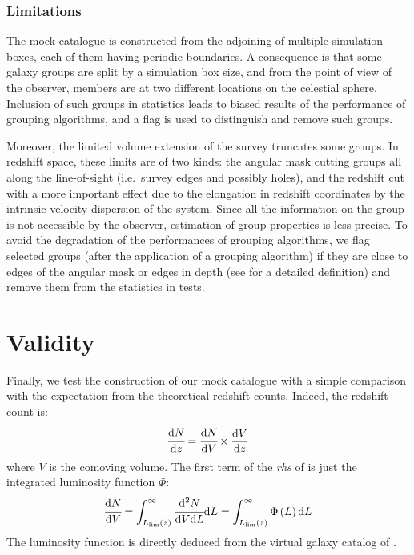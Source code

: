 \subsubsection{Limitations}
\label{ssub:galaxy_samples_limitations}

The mock catalogue is constructed from the adjoining of multiple simulation
boxes, each of them having periodic boundaries. A consequence is that some
galaxy groups are split by a simulation box size, and from the point of view of
the observer, members are at two different locations on the celestial sphere.
Inclusion of such groups in statistics leads to biased results of the
performance of grouping algorithms, and a flag is used to distinguish and
remove such groups.

Moreover, the limited volume extension of the survey truncates some groups. In
redshift space, these limits are of two kinds: the angular mask cutting groups
all along the line-of-sight (i.e.\ survey edges and possibly holes), and the
redshift cut with a more important effect due to the elongation in redshift
coordinates by the intrinsic velocity dispersion of the system. Since all the
information on the group is not accessible by the observer, estimation of group
properties is less precise. To avoid the degradation of the performances of
grouping algorithms, we flag selected groups (after the application of a
grouping algorithm) if they are close to edges of the angular mask or edges in
depth (see  for a detailed
definition) and remove them from the statistics in tests.

\section{Validity}
\label{sec:validity}

Finally, we test the construction of our mock catalogue with a simple
comparison with the expectation from the theoretical redshift counts. Indeed,
the redshift count is:
%
\begin{equation}
    \label{eq:counts}
    \cfrac{{\rm{d}} N}{{\rm{d}} z} = \cfrac{{\rm{d}} N}{{\rm{d}} V}\times\frac{{\rm{d}} V}{{\rm{d}} z}
\end{equation}
%
where $V$ is the comoving volume.
The first term of the \emph{rhs} of  is just the integrated luminosity function
$\Phi$:
%
\begin{equation}
    \cfrac{{\rm{d}} N}{{\rm{d}} V} = \int_{L_{\lim} \left(z\right)}^\infty
    \cfrac{{\rm{d}}^2 N}{{\rm{d}} V {\rm{d}} L}{\rm{d}} L = \int_{L_{\lim} \left(z\right)}^\infty \Phi \left(L\right){\rm{d}} L
\end{equation}
%
The luminosity function is directly deduced from the virtual galaxy catalog of
\citet{Guo+11}.

